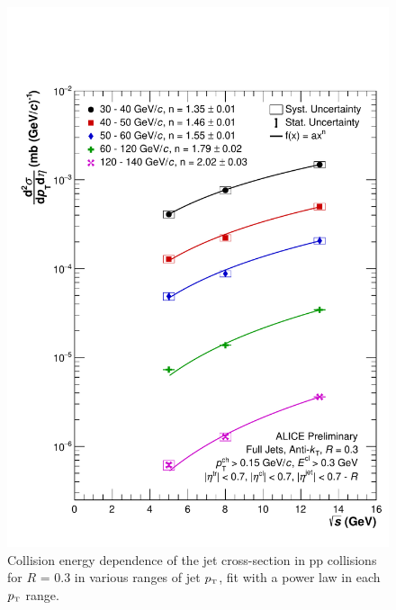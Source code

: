 \documentclass[ALICE]{ALICE_analysis_notes}
\newcommand{\pT}{$p_{\mbox{\tiny T}}$\xspace}
\newcommand{\pp}{pp\xspace}
\begin{document}
\begin{appendix}
\begin{figure}[h!]
    \centering
    \includegraphics[width=15cm]{figures/EnergyComparisons/sqrtSComp_R03.pdf}
    \caption{Collision energy dependence of the jet cross-section in \pp collisions for $R$ = 0.3 in various ranges of jet \pT, fit with a power law in each \pT range.}
    \label{fig:appSqrtSCompareR03}
\end{figure}


\end{appendix}
\end{document}

